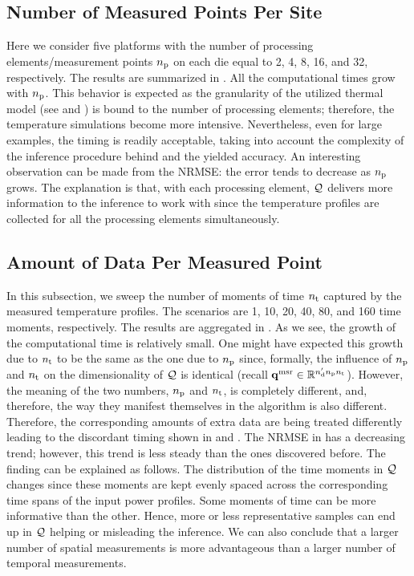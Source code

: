 \subsection{Number of Measured Points Per Site}
Here we consider five platforms with the number of processing elements/measurement points ${n_\text{p}}$ on each die equal to 2, 4, 8, 16, and 32, respectively.
The results are summarized in .
All the computational times grow with ${n_\text{p}}$.
This behavior is expected as the granularity of the utilized thermal model (see  and \cite{ukhov2012}) is bound to the number of processing elements; therefore, the temperature simulations become more intensive.
Nevertheless, even for large examples, the timing is readily acceptable, taking into account the complexity of the inference procedure behind and the yielded accuracy.
An interesting observation can be made from the NRMSE: the error tends to decrease as ${n_\text{p}}$ grows.
The explanation is that, with each processing element, $\mathcal{Q}$ delivers more information to the inference to work with since the temperature profiles are collected for all the processing elements simultaneously.

\subsection{Amount of Data Per Measured Point}
In this subsection, we sweep the number of moments of time ${n_\text{t}}$ captured by the measured temperature profiles.
The scenarios are 1, 10, 20, 40, 80, and 160 time moments, respectively.
The results are aggregated in .
As we see, the growth of the computational time is relatively small.
One might have expected this growth due to ${n_\text{t}}$ to be the same as the one due to ${n_\text{p}}$ since, formally, the influence of ${n_\text{p}}$ and ${n_\text{t}}$ on the dimensionality of $\mathcal{Q}$ is identical (recall $\mathbf{q}^{\text{msr}} \in \mathbb{R}^{{n_\text{d}'} {n_\text{p}} {n_\text{t}}}$).
However, the meaning of the two numbers, ${n_\text{p}}$ and ${n_\text{t}}$, is completely different, and, therefore, the way they manifest themselves in the algorithm is also different.
Therefore, the corresponding amounts of extra data are being treated differently leading to the discordant timing shown in  and .
The NRMSE in  has a decreasing trend; however, this trend is less steady than the ones discovered before. The finding can be explained as follows.
The distribution of the time moments in $\mathcal{Q}$ changes since these moments are kept evenly spaced across the corresponding time spans of the input power profiles.
Some moments of time can be more informative than the other.
Hence, more or less representative samples can end up in $\mathcal{Q}$ helping or misleading the inference.
We can also conclude that a larger number of spatial measurements is more advantageous than a larger number of temporal measurements.

